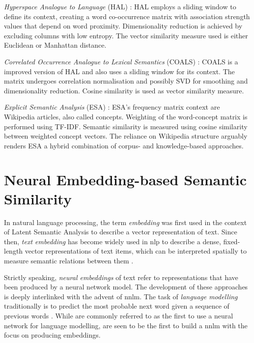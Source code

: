 \documentclass[11pt, numbers=noenddot]{scrreprt}
\let\citef\cite  %
\let\cite\parencite  %
\begin{document}
\textit{Hyperspace Analogue to Language} (HAL) \cite{lundProducingHighdimensionalSemantic1996}: HAL employs a sliding window to define its context, creating a word co-occurrence matrix with association strength values that depend on word proximity. Dimensionality reduction is achieved by excluding columns with low entropy. The vector similarity measure used is either Euclidean or Manhattan distance.

\textit{Correlated Occurrence Analogue to Lexical Semantics} (COALS) \cite{rohde2006improved}: COALS is a improved version of HAL and also uses a sliding window for its context. The matrix undergoes correlation normalisation and possibly SVD for smoothing and dimensionality reduction. Cosine similarity is used as vector similarity measure.

\textit{Explicit Semantic Analysis} (ESA) \cite{gabrilovich2007computing}: ESA's frequency matrix context are Wikipedia articles, also called concepts. Weighting of the word-concept matrix is performed using TF-IDF. Semantic similarity is measured using cosine similarity between weighted concept vectors. The reliance on Wikipedia structure arguably renders ESA a hybrid combination of corpus- and knowledge-based approaches.


\section{Neural Embedding-based Semantic Similarity}
\label{sec:neural-embedding-semantic-similarity}

In natural language processing, the term \textit{embedding} was first used in the context of Latent Semantic Analysis \cite{deerwesterIndexingLatentSemantic1990} to describe a vector representation of text. Since then, \textit{text embedding} has become widely used in \gls{nlp} to describe a dense, fixed-length vector representations of text items, which can be interpreted spatially to measure semantic relations between them \cite{almeidaWordEmbeddingsSurvey2023}.

Strictly speaking, \textit{neural embeddings} of text refer to representations that have been produced by a neural network model. The development of these approaches is deeply interlinked with the advent of \gls{nnlm}. The task of \textit{language modelling} traditionally is to predict the most probable next word given a sequence of previous words \cite{chenEmpiricalStudySmoothing1999}. While \citef{bengioNeuralProbabilisticLanguage2000} are commonly referred to as the first to use a neural network for language modelling, \citef{collobertUnifiedArchitectureNatural2008} are seen to be the first to build a \gls{nnlm} with the focus on producing embeddings. 
\end{document}
